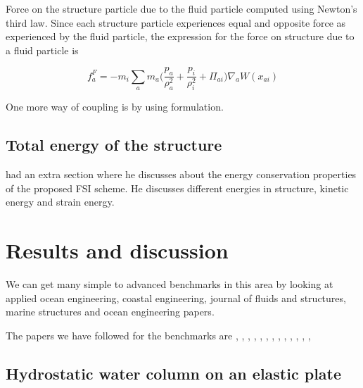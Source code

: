 \documentclass[preprint,12pt]{elsarticle}
\begin{document}
Force on the structure particle due to the fluid particle computed using
Newton's third law. Since each structure particle experiences equal and
opposite force as experienced by the fluid particle, the expression for the
force on structure due to a fluid particle is

\begin{equation}
  f_a^F = -m_i \sum_{a} m_a \bigg(\frac{p_a}{\rho_{a}^2} +
  \frac{p_i}{\rho_{i}^2} + \Pi_{ai} \bigg) \nabla_{a} W(x_{ai})
\end{equation}


One more way of coupling is by using \citet{khayyer2018enhanced} formulation.



\subsection{Total energy of the structure}
\label{sec:total-energy-struct}

\citet{khayyer2018enhanced} had an extra section where he discusses about the
energy conservation properties of the proposed FSI scheme. He discusses
different energies in structure, kinetic energy and strain energy.



\section{Results and discussion}
\label{sec:results}

We can get many simple to advanced benchmarks in this area by looking at
applied ocean engineering, coastal engineering, journal of fluids and
structures, marine structures and ocean engineering papers.


The papers we have followed for the benchmarks are
\citet{sun2021accurate}, \citet{yang2016numerical}, \citet{Sun2019study},
\citet{He2017coupled}, \citet{khayyer2018enhanced}, \citet{sun2015numerical},
\citet{wang2020scale}, \citet{peng2021coupling}, \citet{zhang2021deltasph},
\citet{zhan2019stabilized}, \citet{khayyer2021multi},
\citet{long2021coupling}, \citet{ng2020coupled},



\subsection{Hydrostatic water column on an elastic plate}
\label{sec:results:hstank-elastic-plate}
\end{document}
